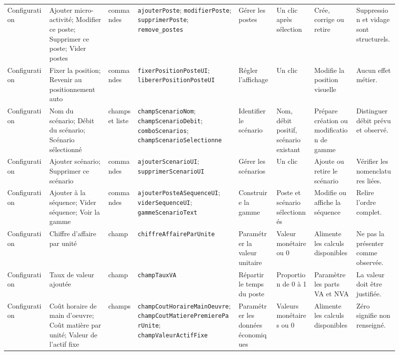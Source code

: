 \begin{landscape}
{\begin{longtable}{L{0.10\linewidth} L{0.14\linewidth} L{0.07\linewidth} L{0.24\linewidth} L{0.09\linewidth} L{0.09\linewidth} L{0.10\linewidth} L{0.10\linewidth}}
Configuration & Ajouter micro-activité; Modifier ce poste; Supprimer ce poste; Vider postes & commandes & \texttt{ajouterPoste}; \texttt{modifierPoste}; \texttt{supprimerPoste}; \texttt{remove\_postes} & Gérer les postes & Un clic après sélection & Crée, corrige ou retire & Suppression et vidage sont structurels. \\
Configuration & Fixer la position; Revenir au positionnement auto & commandes & \texttt{fixerPositionPosteUI}; \texttt{libererPositionPosteUI} & Régler l'affichage & Un clic & Modifie la position visuelle & Aucun effet métier. \\
Configuration & Nom du scénario; Débit du scénario; Scénario sélectionné & champs et liste & \texttt{champScenarioNom}; \texttt{champScenarioDebit}; \texttt{comboScenarios}; \texttt{champScenarioSelectionne} & Identifier le scénario & Nom, débit positif, scénario existant & Prépare création ou modification de gamme & Distinguer débit prévu et observé. \\
Configuration & Ajouter scénario; Supprimer ce scénario & commandes & \texttt{ajouterScenarioUI}; \texttt{supprimerScenarioUI} & Gérer les scénarios & Un clic & Ajoute ou retire le scénario & Vérifier les nomenclatures liées. \\
Configuration & Ajouter à la séquence; Vider séquence; Voir la gamme & commandes & \texttt{ajouterPosteASequenceUI}; \texttt{viderSequenceUI}; \texttt{gammeScenarioText} & Construire la gamme & Poste et scénario sélectionnés & Modifie ou affiche la séquence & Relire l'ordre complet. \\
Configuration & Chiffre d'affaire par unité & champ & \texttt{chiffreAffaireParUnite} & Paramétrer la valeur unitaire & Valeur monétaire ou 0 & Alimente les calculs disponibles & Ne pas la présenter comme observée. \\
Configuration & Taux de valeur ajoutée & champ & \texttt{champTauxVA} & Répartir le temps du poste & Proportion de 0 à 1 & Paramètre les parts VA et NVA & La valeur doit être justifiée. \\
Configuration & Coût horaire de main d'oeuvre; Coût matière par unité; Valeur de l'actif fixe & champs & \texttt{champCoutHoraireMainOeuvre}; \texttt{champCoutMatierePremiereParUnite}; \texttt{champValeurActifFixe} & Paramétrer les données économiques & Valeurs monétaires ou 0 & Alimente les calculs disponibles & Zéro signifie non renseigné. \\


\end{longtable}}
\end{landscape}
